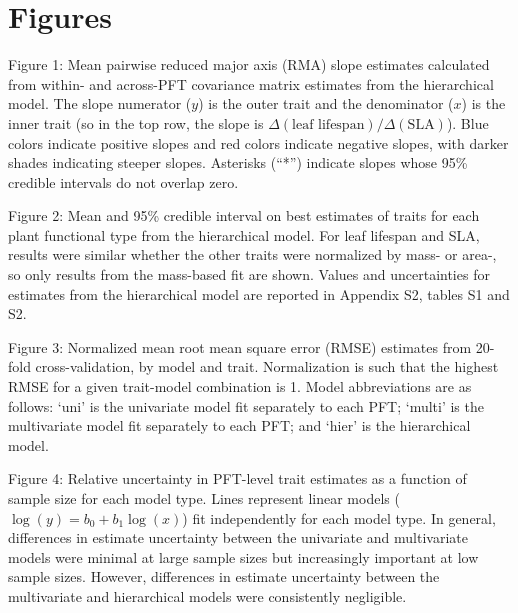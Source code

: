 \documentclass{article}
\begin{document}
\section{Figures}

\pagebreak

\noindent Figure 1:
Mean pairwise reduced major axis (RMA) slope estimates calculated from within- and across-PFT covariance matrix estimates from the hierarchical model.
The slope numerator ($y$) is the outer trait and the denominator ($x$) is the inner trait (so in the top row, the slope is $\Delta(\textrm{leaf lifespan}) / \Delta(\textrm{SLA})$).
Blue colors indicate positive slopes and red colors indicate negative slopes, with darker shades indicating steeper slopes.
Asterisks (``*'') indicate slopes whose 95\% credible intervals do not overlap zero.

\vspace{\baselineskip}

\noindent Figure 2:
Mean and 95\% credible interval on best estimates of traits for each plant functional type from the hierarchical model.
For leaf lifespan and SLA, results were similar whether the other traits were normalized by mass- or area-, so only results from the mass-based fit are shown.
Values and uncertainties for estimates from the hierarchical model are reported in Appendix S2, tables S1 and S2.

\vspace{\baselineskip}

\noindent Figure 3:
Normalized mean root mean square error (RMSE) estimates from 20-fold cross-validation, by model and trait.
Normalization is such that the highest RMSE for a given trait-model combination is 1.
Model abbreviations are as follows:
`uni' is the univariate model fit separately to each PFT;\@
`multi' is the multivariate model fit separately to each PFT;\@
and `hier' is the hierarchical model.

\vspace{\baselineskip}

\noindent Figure 4:
Relative uncertainty in PFT-level trait estimates as a function of sample size for each model type.
Lines represent linear models ($\log(y) = b_0 + b_1 \log(x)$) fit independently for each model type.
In general, differences in estimate uncertainty between the univariate and multivariate models were minimal at large sample sizes but increasingly important at low sample sizes.
However, differences in estimate uncertainty between the multivariate and hierarchical models were consistently negligible.
\end{document}
